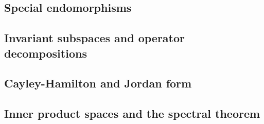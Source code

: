 

\subsection{Special endomorphisms}






\subsection{Invariant subspaces and operator decompositions}






\subsection{Cayley-Hamilton and Jordan form}







\subsection{Inner product spaces and the spectral theorem}

